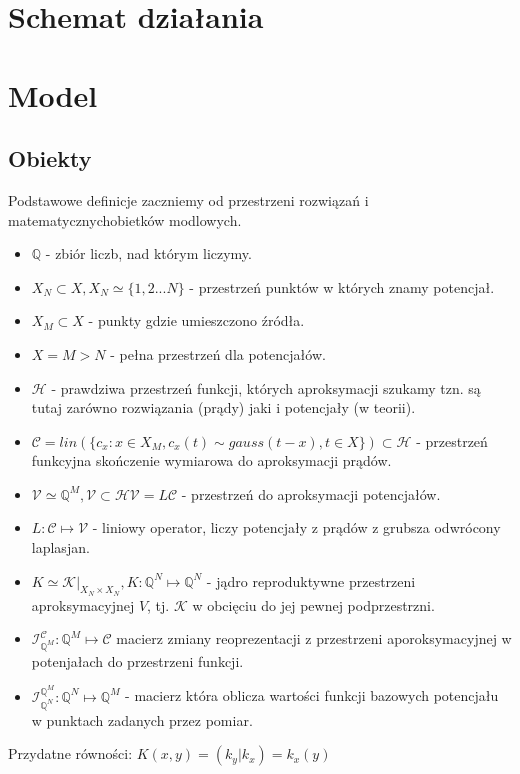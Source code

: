 \documentclass[9pt]{article}
\newcommand{\Q}{\mathbb{Q}}
\newcommand{\HS}{\mathcal{H}}
\newcommand{\V}{\mathcal{V}}
\newcommand{\C}{\mathcal{C}}
\newcommand{\IC}{ \mathcal{I}_{\Q^M}^{\C}}
\newcommand{\IV}{ \mathcal{I}_{\Q^N}^{\Q^M}}
\begin{document}
\section{Schemat działania}

\section{Model}
\subsection{Obiekty}
Podstawowe definicje zaczniemy od przestrzeni rozwiązań i matematycznychobietków modlowych.
\begin{itemize}
\item $\Q$ - zbiór liczb, nad którym liczymy.
\item $X_N \subset X, X_N \simeq \{1,2 ...N\}$ - przestrzeń punktów 
w których znamy potencjał.
\item $X_M \subset X$ - punkty gdzie umieszczono źródła.
\item $X =M>N$ - pełna przestrzeń dla potencjałów.
\item $\HS$ - prawdziwa przestrzeń funkcji, których aproksymacji szukamy
    tzn. są tutaj zarówno rozwiązania (prądy) jaki i potencjały (w teorii).
\item $\C = lin(\{ c_x: x \in X_M, c_x(t) \sim gauss(t-x), t\in X \}) \subset \HS$ 
- przestrzeń funkcyjna skończenie wymiarowa do aproksymacji prądów.
\item $\V \simeq {\Q^M}, \V \subset \HS \V=L\C$ - przestrzeń do aproksymacji potencjałów.
\item $L: \C \mapsto \V$ - liniowy operator, liczy potencjały z prądów
z grubsza odwrócony laplasjan.
\item $K \simeq \mathcal{K}|_{X_N \times  X_N}, K: \Q^N \mapsto \Q^N$ - jądro 
reproduktywne przestrzeni aproksymacyjnej $V$, tj. $\mathcal{K}$
w obcięciu do jej pewnej podprzestrzni.
\item $\IC: \Q^M \mapsto \C$ macierz zmiany reoprezentacji z przestrzeni
aporoksymacyjnej w potenjałach do przestrzeni funkcji.
\item $\IV: \Q^N \mapsto \Q^M$ - macierz która oblicza wartości funkcji bazowych 
potencjału w punktach zadanych przez pomiar.
\end{itemize}
Przydatne równości:
$K({x,y}) = (k_y| k_x) = k_x(y)$
\end{document}
